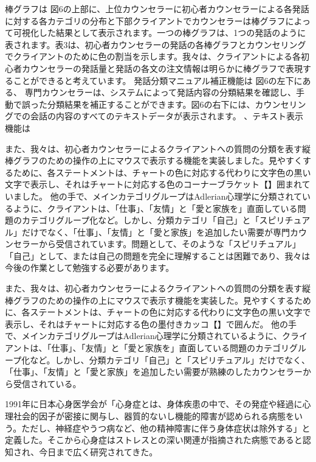 \documentclass[shuuron]{kuee}
\begin{document}
棒グラフは
図6の上部に、上位カウンセラーに初心者カウンセラーによる各発話に対する各カテゴリの分布と下部クライアントでカウンセラーは棒グラフによって可視化した結果として表示されます。一つの棒グラフは、1つの発話のように表されます。表3は、初心者カウンセラーの発話の各棒グラフとカウンセリングでクライアントのために色の割当を示します。我々は、クライアントによる各初心者カウンセラーの発話量と発話の各文の注文情報は明らかに棒グラフで表現することができると考えています。
発話分類マニュアル補正機能は
  図6の左下にある、 専門カウンセラーは、システムによって発話内容の分類結果を確認し、手動で誤った分類結果を補正することができます。図6の右下には、カウンセリングでの会話の内容のすべてのテキストデータが表示されます。
、テキスト表示機能は

また、我々は、初心者カウンセラーによるクライアントへの質問の分類を表す縦棒グラフのための操作の上にマウスで表示する機能を実装しました。見やすくするために、各ステートメントは、チャートの色に対応する代わりに文字色の黒い文字で表示し、それはチャートに対応する色のコーナーブラケット【】囲まれていました。
他の手で、メインカテゴリグループはAdlerian心理学に分類されているように、クライアントは、「仕事」、「友情」と「愛と家族を」直面している問題のカテゴリグループ化など。しかし、分類カテゴリ「自己」と「スピリチュアル」だけでなく、「仕事」、「友情」と「愛と家族」を追加したい需要が専門カウンセラーから受信されています。問題として、そのような「スピリチュアル」「自己」として、または自己の問題を完全に理解することは困難であり、我々は今後の作業として勉強する必要があります。

また、我々は、初心者カウンセラーによるクライアントへの質問の分類を表す縦棒グラフのための操作の上にマウスで表示す機能を実装した。見やすくするために、各ステートメントは、チャートの色に対応する代わりに文字色の黒い文字で表示し、それはチャートに対応する色の墨付きカッコ【】で囲んだ。
他の手で、メインカテゴリグループはAdlerian心理学に分類されているように、クライアントは、「仕事」、「友情」と「愛と家族を」直面している問題のカテゴリグループ化など。しかし、分類カテゴリ「自己」と「スピリチュアル」だけでなく、「仕事」、「友情」と「愛と家族」を追加したい需要が熟練のしたカウンセラーから受信されている。

1991年に日本心身医学会が「心身症とは、身体疾患の中で、その発症や経過に心理社会的因子が密接に関与し、器質的ないし機能的障害が認められる病態をいう。ただし、神経症やうつ病など、他の精神障害に伴う身体症状は除外する」と定義した。そこから心身症はストレスとの深い関連が指摘された病態であると認知され、今日まで広く研究されてきた。
\end{document}
